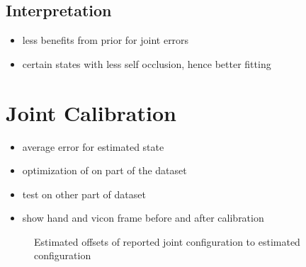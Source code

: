 \subsection{Interpretation}

\begin{itemize}
\item less benefits from prior for joint errors
\item certain states with less self occlusion, hence better fitting
\end{itemize}


\section{Joint Calibration}

\begin{itemize}
\item average error for estimated state
\item optimization of on part of the dataset
\item test on other part of dataset
\item show hand and vicon frame before and after calibration
\end{itemize}

\begin{figure}
\centering
{}

\caption{Estimated offsets of reported joint configuration to estimated configuration}
\end{figure}


